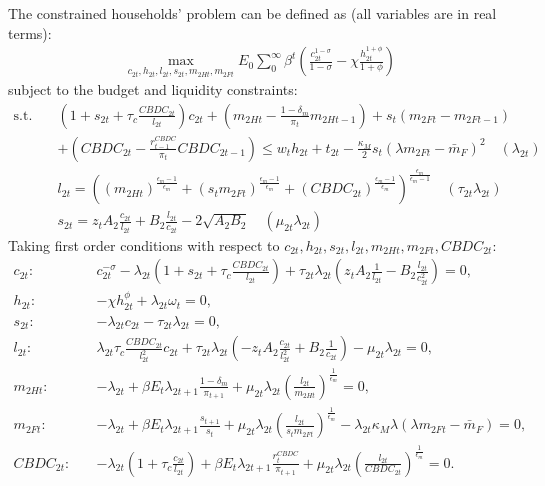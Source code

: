 \documentclass[12pt]{article}
\begin{document}
The constrained households' problem can be defined as (all variables are in real terms):
\begin{align*}
\max_{c_{2t}, h_{2t},l_{2t},s_{2t},m_{2Ht},m_{2Ft}} E_0 \sum_0^{\infty}\beta^t (\frac{c_{2t}^{1-\sigma}}{1-\sigma}-\chi\frac{h_{2t}^{1+\phi}}{1+\phi})
\end{align*}
subject to the budget and liquidity constraints:
\begin{align*} 
\text{s.t.} \quad & (1+s_{2t}+\tau_c\frac{CBDC_{2t}}{l_{2t}})c_{2t}+(m_{2Ht}-\frac{1-\delta_m}{\pi_t}m_{2Ht-1})+s_t(m_{2Ft}-m_{2Ft-1})\\
&+(CBDC_{2t}-\frac{r_{t-1}^{CBDC}}{\pi_t}CBDC_{2t-1})  \leq w_th_{2t}+t_{2t}-\frac{\kappa_M}{2}s_t(\lambda m_{2Ft}-\bar{m}_F)^2  \quad (\lambda_{2t})\\
&l_{2t} = ((m_{2Ht})^{\frac{\epsilon_m-1}{\epsilon_m}}+(s_t m_{2Ft})^{\frac{\epsilon_m-1}{\epsilon_m}}+(CBDC_{2t})^{\frac{\epsilon_m-1}{\epsilon_m}})^{\frac{\epsilon_m}{\epsilon_m-1}} \quad (\tau_{2t}\lambda_{2t}) \\
& s_{2t} = z_tA_2\frac{c_{2t}}{l_{2t}}+B_2\frac{l_{2t}}{c_{2t}}-2\sqrt{A_2B_2} \quad (\mu_{2t}\lambda_{2t})
\end{align*}
Taking first order conditions with respect to $c_{2t}, h_{2t}, s_{2t}, l_{2t}, m_{2Ht}, m_{2Ft}, CBDC_{2t}$: 
\begin{align*}
c_{2t}: \quad &c_{2t}^{-\sigma}-\lambda_{2t}(1+s_{2t}+\tau_c\frac{CBDC_{2t}}{l_{2t}})+\tau_{2t}\lambda_{2t}(z_tA_2\frac{1}{l_{2t}}-B_2\frac{l_{2t}}{c_{2t}^2}) = 0, \\
h_{2t}: \quad &-\chi h_{2t}^{\phi}+\lambda_{2t}\omega_t  = 0, \\
s_{2t}: \quad &-\lambda_{2t}c_{2t}-\tau_{2t}\lambda_{2t} = 0, \\
l_{2t}: \quad &\lambda_{2t}\tau_c\frac{CBDC_{2t}}{l_{2t}^2}c_{2t}+\tau_{2t}\lambda_{2t}(-z_tA_2\frac{c_{2t}}{l_{2t}^2}+B_2\frac{1}{c_{2t}})-\mu_{2t}\lambda_{2t} = 0, \\
m_{2Ht}: \quad &-\lambda_{2t}+\beta E_t\lambda_{2t+1}\frac{1-\delta_m}{\pi_{t+1}}+\mu_{2t} \lambda_{2t}(\frac{l_{2t}}{m_{2Ht}})^{\frac{1}{\epsilon_m}}= 0, \\
m_{2Ft}: \quad &-\lambda_{2t}+\beta E_t\lambda_{2t+1}\frac{s_{t+1}}{s_t}+\mu_{2t} \lambda_{2t}(\frac{l_{2t}}{s_tm_{2Ft}})^{\frac{1}{\epsilon_m}}-\lambda_{2t}\kappa_M\lambda(\lambda m_{2Ft}-\bar{m}_F) = 0, \\
CBDC_{2t}: \quad &-\lambda_{2t}(1+\tau_c\frac{c_{2t}}{l_{2t}})+\beta E_t\lambda_{2t+1}\frac{r_{t}^{CBDC}}{\pi_{t+1}}+\mu_{2t} \lambda_{2t}(\frac{l_{2t}}{CBDC_{2t}})^{\frac{1}{\epsilon_m}}= 0.
\end{align*}
\end{document}

